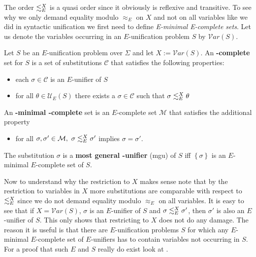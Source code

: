 The order $\lesssim^X_E$ is a quasi order since it obviously is reflexive and transitive. To see why we only demand equality modulo $\approx_E$ on $X$ and not on all variables like we did in syntactic unification we first need to define \emph{E-minimal E-complete sets}.
Let us denote the variables occurring in an $E$-unification problem $S$ by $\mathcal{V}ar(S)$.
\begin{definition}
	Let $S$ be an $E$-unification problem over $\Sigma$ and let $X:=\mathcal{V}ar(S)$. An \textbf{\mBold-complete} set for $S$ is a set of substitutions $\mathcal{C}$ that satisfies the following properties:
	\begin{itemize}
		\item each $\sigma \in \mathcal{C}$ is an $E$-unifier of $S$
		\item for all $\theta \in\mathcal{U}_E(S)$ there exists a $\sigma \in \mathcal{C}$ such that $\sigma\lesssim^X_E\theta$
	\end{itemize}
	An \textbf{\mBold-minimal \mBold-complete} set is an $E$-complete set  $\mathcal{M}$ that satisfies the additional property
	\begin{itemize}
		\item for all $\sigma,\sigma'\in\mathcal{M},\ \sigma\moreGeneral\sigma'$ implies $\sigma=\sigma'$.
	\end{itemize}
	The substitution $\sigma$ is a \textbf{most general \mBold-unifier} (mgu) of $S$ iff $\left\lbrace \sigma\right\rbrace$ is an $E$-minimal $E$-complete set of $S$.
\end{definition}
Now to understand why the restriction to $X$ makes sense note that by the restriction to variables in $X$ more substitutions are comparable with respect to $\lesssim^X_E$ since we do not demand equality modulo $\approx_E$ on all variables. It is easy to see that if $X=\mathcal{V}ar(S)$, $\sigma$ is an $E$-unifier of $S$ and $\sigma\lesssim^X_E\sigma'$, then $\sigma'$ is also an $E$-unifier of $S$. This only shows that restricting to $X$ does not do any damage. The reason it is useful is that there are $E$-unification problems $S$ for which any $E$-minimal $E$-complete set of $E$-unifiers has to contain variables not occurring in $S$. For a proof that such $E$ and $S$ really do exist look at .
 
